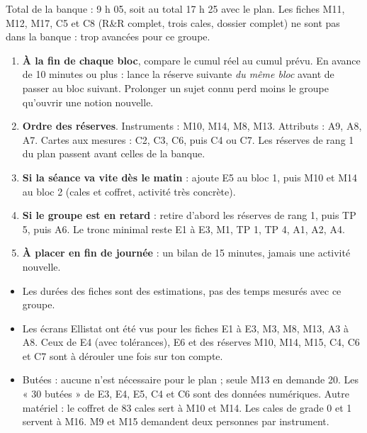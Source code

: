 \documentclass[10pt,a4paper]{article}
\begin{document}
\par\smallskip
\footnotesize Total de la banque : 9 h 05, soit au total 17 h 25 avec le plan. Les fiches M11, M12, M17, C5 et C8 (R\&R complet, trois cales, dossier complet) ne sont pas dans la banque : trop avancées pour ce groupe.

\begin{enumerate}[leftmargin=16pt,itemsep=2pt]
\item \textbf{À la fin de chaque bloc}, compare le cumul réel au cumul prévu. En avance de 10 minutes ou plus : lance la réserve suivante \emph{du même bloc} avant de passer au bloc suivant. Prolonger un sujet connu perd moins le groupe qu'ouvrir une notion nouvelle.
\item \textbf{Ordre des réserves}. Instruments : M10, M14, M8, M13. Attributs : A9, A8, A7. Cartes aux mesures : C2, C3, C6, puis C4 ou C7. Les réserves de rang 1 du plan passent avant celles de la banque.
\item \textbf{Si la séance va vite dès le matin} : ajoute E5 au bloc 1, puis M10 et M14 au bloc 2 (cales et coffret, activité très concrète).
\item \textbf{Si le groupe est en retard} : retire d'abord les réserves de rang 1, puis TP 5, puis A6. Le tronc minimal reste E1 à E3, M1, TP 1, TP 4, A1, A2, A4.
\item \textbf{À placer en fin de journée} : un bilan de 15 minutes, jamais une activité nouvelle.
\end{enumerate}

\begin{itemize}[leftmargin=14pt,itemsep=1pt]
\item Les durées des fiches sont des estimations, pas des temps mesurés avec ce groupe.
\item Les écrans Ellistat ont été vus pour les fiches E1 à E3, M3, M8, M13, A3 à A8. Ceux de E4 (avec tolérances), E6 et des réserves M10, M14, M15, C4, C6 et C7 sont à dérouler une fois sur ton compte.
\item Butées : aucune n'est nécessaire pour le plan ; seule M13 en demande 20. Les « 30 butées » de E3, E4, E5, C4 et C6 sont des données numériques. Autre matériel : le coffret de 83 cales sert à M10 et M14. Les cales de grade 0 et 1 servent à M16. M9 et M15 demandent deux personnes par instrument.
\end{itemize}
\end{document}
